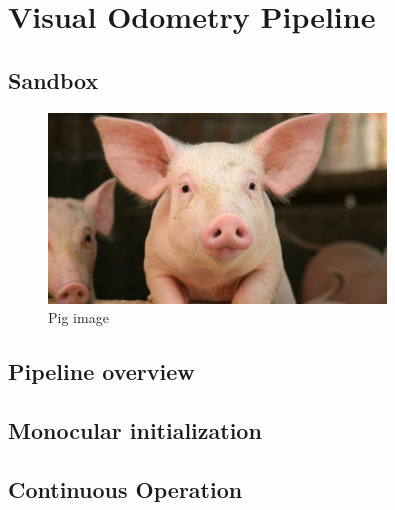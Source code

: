 \documentclass[a4paper,10pt]{article} %
\begin{document}
\section{Visual Odometry Pipeline}

\subsection{Sandbox}
\begin{figure}[ht]
	\includegraphics[width=0.8\textwidth]{pig}
	\caption{Pig image}
	\label{img_pig}
\end{figure}

\subsection{Pipeline overview}



\subsection{Monocular initialization}

\subsection{Continuous Operation}


\newpage
%
\end{document}
